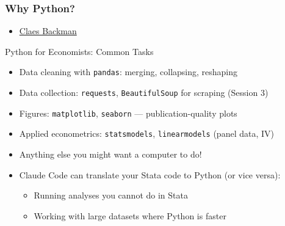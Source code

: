 \documentclass[aspectratio=169, 12pt]{beamer}
\begin{document}
\begin{frame}
\frametitle{Why Python?}


\begin{itemize}
    \item \href{https://claesbackman.com/claude-code-guide.html\#:~:text=of\%20Economics.-,Python,-ms\%2Dpython.python}{Claes Backman}
\end{itemize}
Python for Economists: Common Tasks

\begin{itemize}
    \item Data cleaning with \texttt{pandas}: merging, collapsing, reshaping 
    \item Data collection: \texttt{requests}, \texttt{BeautifulSoup} for scraping (Session 3)
    \item Figures: \texttt{matplotlib}, \texttt{seaborn} --- publication-quality plots
    \item Applied econometrics: \texttt{statsmodels}, \texttt{linearmodels} (panel data, IV)
    \item Anything else you might want a computer to do!
    \vspace{.05in}
    \item Claude Code can translate your Stata code to Python (or vice versa):
        \begin{itemize}
            \item[$\circ$] Running analyses you cannot do in Stata
            \item[$\circ$] Working with large datasets where Python is faster
        \end{itemize}
\end{itemize}
\end{frame}
\end{document}
